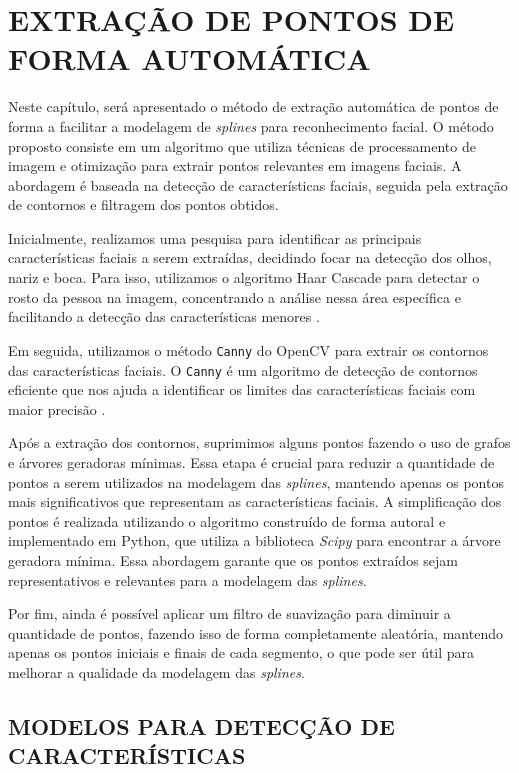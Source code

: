 \chapter{EXTRAÇÃO DE PONTOS DE FORMA AUTOMÁTICA} \label{cha:introd} 

Neste capítulo, será apresentado o método de extração automática de pontos de forma a facilitar a modelagem de \textit{splines} para reconhecimento facial. O método proposto consiste em um algoritmo que utiliza técnicas de processamento de imagem e otimização para extrair pontos relevantes em imagens faciais. A abordagem é baseada na detecção de características faciais, seguida pela extração de contornos e filtragem dos pontos obtidos.

Inicialmente, realizamos uma pesquisa para identificar as principais características faciais a serem extraídas, decidindo focar na detecção dos olhos, nariz e boca. Para isso, utilizamos o algoritmo Haar Cascade para detectar o rosto da pessoa na imagem, concentrando a análise nessa área específica e facilitando a detecção das características menores \cite{BoostedCascade}.

Em seguida, utilizamos o método \texttt{Canny} do OpenCV \cite{CannyAplicacao} para extrair os contornos das características faciais. O \texttt{Canny} é um algoritmo de detecção de contornos eficiente que nos ajuda a identificar os limites das características faciais com maior precisão \cite{Canny}.

Após a extração dos contornos, suprimimos alguns pontos fazendo o uso de grafos e árvores geradoras mínimas. Essa etapa é crucial para reduzir a quantidade de pontos a serem utilizados na modelagem das \textit{splines}, mantendo apenas os pontos mais significativos que representam as características faciais. A simplificação dos pontos é realizada utilizando o algoritmo construído de forma autoral e implementado em Python, que utiliza a biblioteca \textit{Scipy} \cite{Scipy} para encontrar a árvore geradora mínima. Essa abordagem garante que os pontos extraídos sejam representativos e relevantes para a modelagem das \textit{splines}.

Por fim, ainda é possível aplicar um filtro de suavização para diminuir a quantidade de pontos, fazendo isso de forma completamente aleatória, mantendo apenas os pontos iniciais e finais de cada segmento, o que pode ser útil para melhorar a qualidade da modelagem das \textit{splines}.

\section{MODELOS PARA DETECÇÃO DE CARACTERÍSTICAS}

